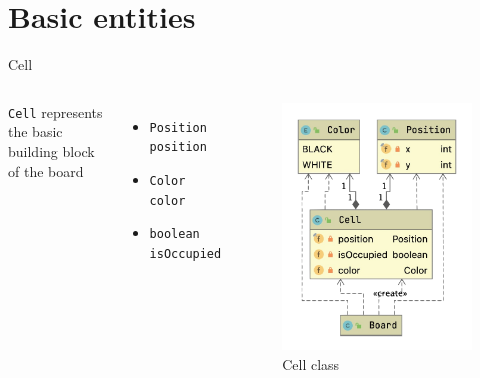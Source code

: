 \documentclass{beamer}
\begin{document}
\section{Basic entities}
\begin{frame}{Cell}

\begin{columns}
\texttt{Cell} represents the basic building block of the board 
\vspace{0.5cm}
\begin{itemize}
    \item \texttt{Position position }
    \item \texttt{Color color}
    \item \texttt{boolean isOccupied}
\end{itemize}

\begin{figure}
	\includegraphics[scale=0.4]{images/cell-class.png}
	\caption*{Cell class}
\end{figure}

\end{columns}





\end{frame}
\end{document}
